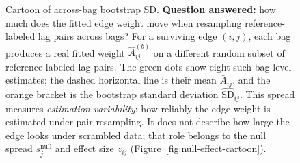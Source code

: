 \documentclass[11pt]{article}
\begin{document}
\begin{figure}[ht]
\centering
{}
\caption{Cartoon of across-bag bootstrap SD.
\textbf{Question answered:} how much does the fitted edge weight move when
resampling reference-labeled lag pairs across bags? For a surviving edge
\((i,j)\), each bag produces a real fitted weight \(\hat A^{(b)}_{ij}\) on a
different random subset of reference-labeled lag pairs. The green dots show
eight such bag-level estimates; the dashed horizontal line is their mean
\(\bar A_{ij}\), and the orange bracket is the bootstrap standard deviation
\(\widehat{\mathrm{SD}}_{ij}\). This spread measures \emph{estimation
variability}: how reliably the edge weight is estimated under pair resampling.
It does not describe how large the edge looks under scrambled data; that role
belongs to the null spread \(s^{\text{null}}_j\) and effect size \(z_{ij}\)
(Figure~\ref{fig:null-effect-cartoon}).}
\label{fig:bootstrap-sd-cartoon}
\end{figure}
\end{document}

